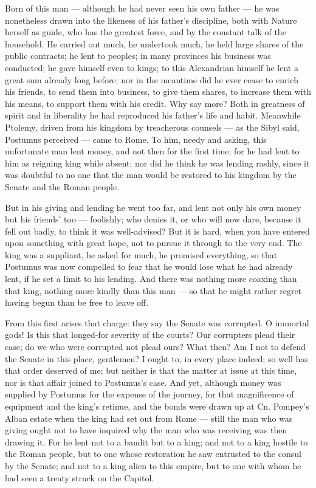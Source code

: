  Born of this man --- although he had never seen his own father --- he was nonetheless drawn into the likeness of his father's discipline, both with Nature herself as guide, who has the greatest force, and by the constant talk of the household. He carried out much, he undertook much, he held large shares of the public contracts; he lent to peoples; in many provinces his business was conducted; he gave himself even to kings; to this Alexandrian himself he lent a great sum already long before; nor in the meantime did he ever cease to enrich his friends, to send them into business, to give them shares, to increase them with his means, to support them with his credit. Why say more? Both in greatness of spirit and in liberality he had reproduced his father's life and habit. Meanwhile Ptolemy, driven from his kingdom by treacherous counsels --- as the Sibyl said, Postumus perceived --- came to Rome. To him, needy and asking, this unfortunate man lent money, and not then for the first time; for he had lent to him as reigning king while absent; nor did he think he was lending rashly, since it was doubtful to no one that the man would be restored to his kingdom by the Senate and the Roman people.

 But in his giving and lending he went too far, and lent not only his own money but his friends' too --- foolishly; who denies it, or who will now dare, because it fell out badly, to think it was well-advised? But it is hard, when you have entered upon something with great hope, not to pursue it through to the very end. The king was a suppliant, he asked for much, he promised everything, so that Postumus was now compelled to fear that he would lose what he had already lent, if he set a limit to his lending. And there was nothing more coaxing than that king, nothing more kindly than this man --- so that he might rather regret having begun than be free to leave off.

 From this first arises that charge: they say the Senate was corrupted. O immortal gods! Is this that longed-for severity of the courts? Our corrupters plead their case; do we who were corrupted not plead ours? What then? Am I not to defend the Senate in this place, gentlemen? I ought to, in every place indeed; so well has that order deserved of me; but neither is that the matter at issue at this time, nor is that affair joined to Postumus's case. And yet, although money was supplied by Postumus for the expense of the journey, for that magnificence of equipment and the king's retinue, and the bonds were drawn up at Cn. Pompey's Alban estate when the king had set out from Rome --- still the man who was giving ought not to have inquired why the man who was receiving was then drawing it. For he lent not to a bandit but to a king; and not to a king hostile to the Roman people, but to one whose restoration he saw entrusted to the consul by the Senate; and not to a king alien to this empire, but to one with whom he had seen a treaty struck on the Capitol.

